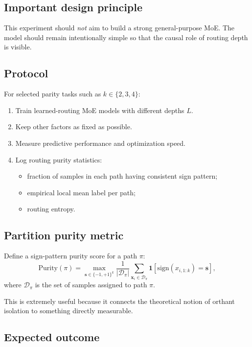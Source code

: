 \documentclass[11pt]{article}
\begin{document}
\subsection{Important design principle}

This experiment should \emph{not} aim to build a strong general-purpose MoE. The model should remain intentionally simple so that the causal role of routing depth is visible.

\subsection{Protocol}

For selected parity tasks such as $k \in \{2,3,4\}$:
\begin{enumerate}[leftmargin=2em]
    \item Train learned-routing MoE models with different depths $L$.
    \item Keep other factors as fixed as possible.
    \item Measure predictive performance and optimization speed.
    \item Log routing purity statistics:
    \begin{itemize}
        \item fraction of samples in each path having consistent sign pattern;
        \item empirical local mean label per path;
        \item routing entropy.
    \end{itemize}
\end{enumerate}

\subsection{Partition purity metric}

Define a sign-pattern purity score for a path $\pi$:
\begin{equation}
    \mathrm{Purity}(\pi) = \max_{\bm{s} \in \{-1,+1\}^k}
    \frac{1}{|\mathcal{D}_\pi|}
    \sum_{\bm{x}_i \in \mathcal{D}_\pi}
    \mathbf{1}\!\left[\mathrm{sign}(x_{i,1:k}) = \bm{s}\right],
\end{equation}
where $\mathcal{D}_\pi$ is the set of samples assigned to path $\pi$.

This is extremely useful because it connects the theoretical notion of orthant isolation to something directly measurable.

\subsection{Expected outcome}
\end{document}
